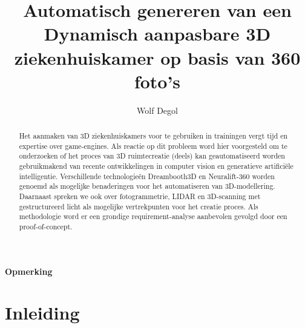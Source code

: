 \documentclass{hogent-article}
\title{Automatisch genereren van een Dynamisch aanpasbare 3D ziekenhuiskamer op basis van 360 foto’s }
\author{Wolf Degol}
\begin{document}
\begin{abstract}
 Het aanmaken van 3D ziekenhuiskamers voor te gebruiken in trainingen  vergt tijd en expertise over game-engines. Als reactie op dit probleem word hier voorgesteld om te onderzoeken of het proces van 3D ruimtecreatie (deels) kan geautomatiseerd worden gebruikmakend van recente ontwikkelingen in computer vision en generatieve artificiële intelligentie. Verschillende technologieën Dreambooth3D en Neuralift-360 worden genoemd als mogelijke benaderingen voor het automatiseren van 3D-modellering.  Daarnaast spreken we ook over fotogrammetrie, LIDAR en 3D-scanning met gestructureerd licht als mogelijke vertrekpunten voor het creatie proces. Als methodologie word er een grondige requirement-analyse aanbevolen gevolgd door een proof-of-concept.
\end{abstract}

\tableofcontents

\bigskip


\paragraph{Opmerking}



\section{Inleiding}%
\label{sec:inleiding}

\end{document}
